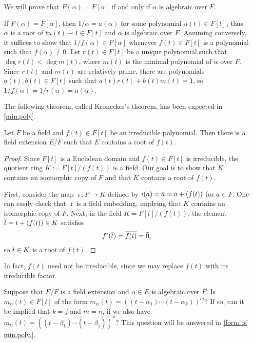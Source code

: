 \begin{obs}
    We will prove that $F(\alpha)=F[\alpha]$ if and only if $\alpha$ is algebraic over $F$.

    If $F(\alpha)=F[\alpha]$, then $1/\alpha=u(\alpha)$ for some polynomial $u(t)\in F[t]$, thus $\alpha$ is a root of $tu(t)-1\in F[t]$ and $\alpha$ is algebraic over $F$.
    Assuming conversely, it suffices to show that $1/f(\alpha)\in F[\alpha]$ whenever $f(t)\in F[t]$ is a polynomial such that $f(\alpha)\neq 0$.
    Let $r(t)\in F[t]$ be a unique polynomial such that $\deg r(t)<\deg m(t)$, where $m(t)$ is the minimal polynomial of $\alpha$ over $F$.
    Since $r(t)$ and $m(t)$ are relatively prime, there are polynomials $a(t), b(t)\in F[t]$ such that $a(t)r(t)+b(t)m(t)=1$, so $1/f(\alpha)=1/r(\alpha)=a(\alpha)$.
\end{obs}

The following theorem, called Kronecker's theorem, has been expected in \cref{min.poly}.
\begin{thm}
    Let $F$ be a field and $f(t)\in F[t]$ be an irreducible polynomial.
    Then there is a field extension $E/F$ such that $E$ contains a root of $f(t)$.
\end{thm}
\begin{proof}
    Since $F[t]$ is a Euclidean domain and $f(t)\in F[t]$ is irreducible, the quotient ring $K:=F[t]/(f(t))$ is a field.
    Our goal is to show that $K$ contains an isomorphic copy of $F$ and that $K$ contains a root of $f(t)$.
    
    First, consider the map $\imath: F\rightarrow K$ defined by $\imath(a)=\overline{a}=a+(f(t))$ for $a\in F$.
    One can easily check that $\imath$ is a field embedding, implying that $K$ contains an isomorphic copy of $F$.
    Next, in the field $K=F[t]/(f(t))$, the element $\overline{t}=t+(f(t))\in K$ satisfies
    \begin{align*}
        f^\imath(\overline{t})=\overline{f(t)}=\overline{0},
    \end{align*}
    so $\overline{t}\in K$ is a root of $f(t)$.
\end{proof}
\begin{rmk}
    In fact, $f(t)$ need not be irreducible, since we may replace $f(t)$ with its irreducible factor.
\end{rmk}

\begin{qst}\label{qst: form of min.poly.}
    Suppose that $E/F$ is a field extension and $\alpha\in E$ is algebraic over $F$.
    Is $m_\alpha(t)\in F[t]$ of the form $m_\alpha(t)=((t-\alpha_1)\cdots(t-\alpha_k))^m$?
    If so, can it be implied that $k=j$ and $m=n$, if we also have $m_\alpha(t)=((t-\beta_1)\cdots(t-\beta_j))^n$?
    This question will be answered in \cref{form of min.poly.}.
\end{qst}

